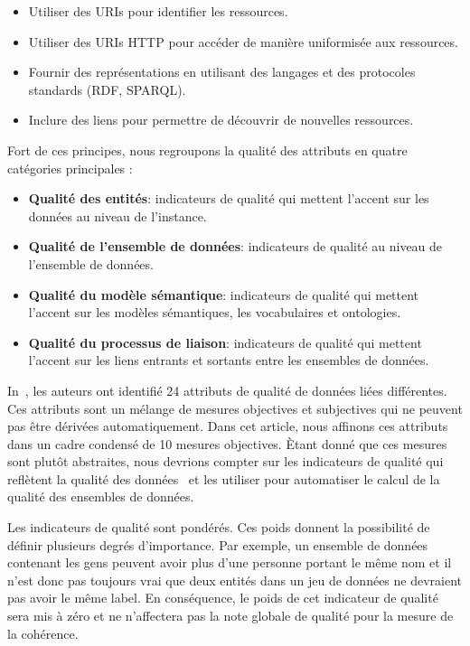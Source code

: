 \begin{itemize}
	\item Utiliser des URIs pour identifier les ressources.
	\item Utiliser des URIs HTTP pour acc\'{e}der de mani\`{e}re uniformis\'{e}e aux ressources.
	\item Fournir des repr\'{e}sentations en utilisant des langages et des protocoles standards (RDF, SPARQL).
	\item Inclure des liens pour permettre de d\'{e}couvrir de nouvelles ressources.
\end{itemize}

\noindent
Fort de ces principes, nous regroupons la qualit\'{e} des attributs en quatre cat\'{e}gories principales :

\begin{itemize}
	\item \textbf{Qualit\'{e} des entit\'{e}s}: indicateurs de qualit\'{e} qui mettent l'accent sur les donn\'{e}es au niveau de l'instance.
	\item \textbf{Qualit\'{e} de l'ensemble de donn\'{e}es}: indicateurs de qualit\'{e} au niveau de l'ensemble de donn\'{e}es.
	\item \textbf{Qualit\'{e} du mod\`{e}le s\'{e}mantique}: indicateurs de qualit\'{e} qui mettent l'accent sur les mod\`{e}les s\'{e}mantiques, les vocabulaires et ontologies.
	\item \textbf{Qualit\'{e} du processus de liaison}: indicateurs de qualit\'{e} qui mettent l'accent sur les liens entrants et sortants entre les ensembles de donn\'{e}es.
\end{itemize}

In~\cite{Assaf:DQMST:12}, les auteurs ont identifi\'{e} 24 attributs de qualit\'{e} de donn\'{e}es li\'{e}es diff\'{e}rentes. Ces attributs sont un m\'{e}lange de mesures objectives et subjectives qui ne peuvent pas être d\'{e}riv\'{e}es automatiquement. Dans cet article, nous affinons ces attributs dans un cadre condens\'{e} de 10 mesures objectives. \`{E}tant donn\'{e} que ces mesures sont plutôt abstraites, nous devrions compter sur les indicateurs de qualit\'{e} qui refl\`{e}tent la qualit\'{e} des donn\'{e}es~\cite{Flemming:Thesis:10} et les utiliser pour automatiser le calcul de la qualit\'{e} des ensembles de donn\'{e}es.

Les indicateurs de qualit\'{e} sont pond\'{e}r\'{e}s. Ces poids donnent la possibilit\'{e} de d\'{e}finir plusieurs degr\'{e}s d'importance. Par exemple, un ensemble de donn\'{e}es contenant les gens peuvent avoir plus d'une personne portant le même nom et il n'est donc pas toujours vrai que deux entit\'{e}s dans un jeu de donn\'{e}es ne devraient pas avoir le même label. En cons\'{e}quence, le poids de cet indicateur de qualit\'{e} sera mis à z\'{e}ro et ne n'affectera pas la note globale de qualit\'{e} pour la mesure de la coh\'{e}rence.

